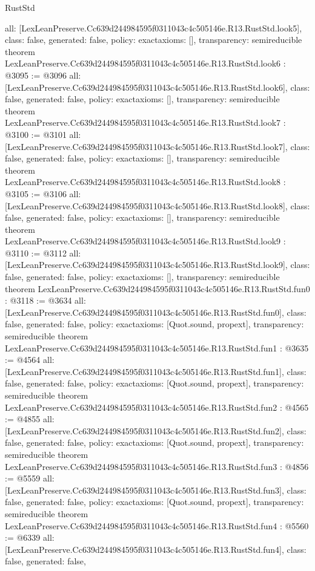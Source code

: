 \begin{lexlean}{RustStd}
\begin{coremodule}
{  all: [LexLeanPreserve.Cc639d244984595f0311043c4c505146e.R13.RustStd.look5],
  class: false,
  generated: false,
  policy: exact{axioms: []},
  transparency: semireducible
}
theorem LexLeanPreserve.Cc639d244984595f0311043c4c505146e.R13.RustStd.look6 : @3095 := @3096 {
  all: [LexLeanPreserve.Cc639d244984595f0311043c4c505146e.R13.RustStd.look6],
  class: false,
  generated: false,
  policy: exact{axioms: []},
  transparency: semireducible
}
theorem LexLeanPreserve.Cc639d244984595f0311043c4c505146e.R13.RustStd.look7 : @3100 := @3101 {
  all: [LexLeanPreserve.Cc639d244984595f0311043c4c505146e.R13.RustStd.look7],
  class: false,
  generated: false,
  policy: exact{axioms: []},
  transparency: semireducible
}
theorem LexLeanPreserve.Cc639d244984595f0311043c4c505146e.R13.RustStd.look8 : @3105 := @3106 {
  all: [LexLeanPreserve.Cc639d244984595f0311043c4c505146e.R13.RustStd.look8],
  class: false,
  generated: false,
  policy: exact{axioms: []},
  transparency: semireducible
}
theorem LexLeanPreserve.Cc639d244984595f0311043c4c505146e.R13.RustStd.look9 : @3110 := @3112 {
  all: [LexLeanPreserve.Cc639d244984595f0311043c4c505146e.R13.RustStd.look9],
  class: false,
  generated: false,
  policy: exact{axioms: []},
  transparency: semireducible
}
theorem LexLeanPreserve.Cc639d244984595f0311043c4c505146e.R13.RustStd.fun0 : @3118 := @3634 {
  all: [LexLeanPreserve.Cc639d244984595f0311043c4c505146e.R13.RustStd.fun0],
  class: false,
  generated: false,
  policy: exact{axioms: [Quot.sound, propext]},
  transparency: semireducible
}
theorem LexLeanPreserve.Cc639d244984595f0311043c4c505146e.R13.RustStd.fun1 : @3635 := @4564 {
  all: [LexLeanPreserve.Cc639d244984595f0311043c4c505146e.R13.RustStd.fun1],
  class: false,
  generated: false,
  policy: exact{axioms: [Quot.sound, propext]},
  transparency: semireducible
}
theorem LexLeanPreserve.Cc639d244984595f0311043c4c505146e.R13.RustStd.fun2 : @4565 := @4855 {
  all: [LexLeanPreserve.Cc639d244984595f0311043c4c505146e.R13.RustStd.fun2],
  class: false,
  generated: false,
  policy: exact{axioms: [Quot.sound, propext]},
  transparency: semireducible
}
theorem LexLeanPreserve.Cc639d244984595f0311043c4c505146e.R13.RustStd.fun3 : @4856 := @5559 {
  all: [LexLeanPreserve.Cc639d244984595f0311043c4c505146e.R13.RustStd.fun3],
  class: false,
  generated: false,
  policy: exact{axioms: [Quot.sound, propext]},
  transparency: semireducible
}
theorem LexLeanPreserve.Cc639d244984595f0311043c4c505146e.R13.RustStd.fun4 : @5560 := @6339 {
  all: [LexLeanPreserve.Cc639d244984595f0311043c4c505146e.R13.RustStd.fun4],
  class: false,
  generated: false,
}
\end{coremodule}
\end{lexlean}
